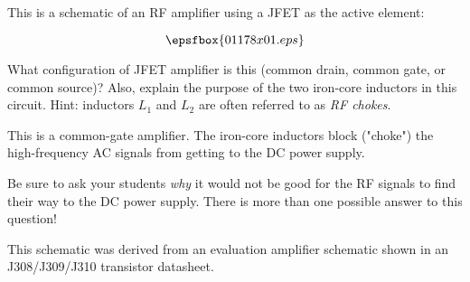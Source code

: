 

This is a schematic of an RF amplifier using a JFET as the active element:

$$\epsfbox{01178x01.eps}$$

What configuration of JFET amplifier is this (common drain, common gate, or common source)?  Also, explain the purpose of the two iron-core inductors in this circuit.  Hint: inductors $L_1$ and $L_2$ are often referred to as {\it RF chokes}.







This is a common-gate amplifier.  The iron-core inductors block ("choke") the high-frequency AC signals from getting to the DC power supply.







Be sure to ask your students {\it why} it would not be good for the RF signals to find their way to the DC power supply.  There is more than one possible answer to this question!

This schematic was derived from an evaluation amplifier schematic shown in an  J308/J309/J310 transistor datasheet.




